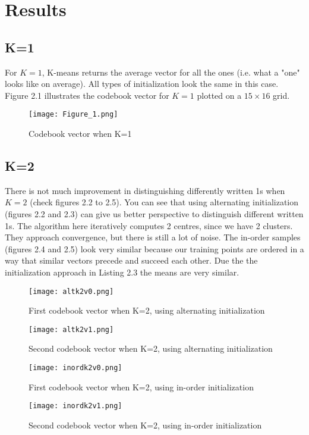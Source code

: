 \documentclass[a4paper, 11pt]{report}
\begin{document}
\section{Results}
\subsection{K=1}
For $K = 1$, K-means returns the average vector for all the ones (i.e. what a "one" looks like on average). All types of initialization look the same in this case. Figure 2.1 illustrates the codebook vector for $K = 1$ plotted on a $15 \times 16$ grid.
\begin{figure}[H]
    \texttt{[image: Figure\_1.png]}
    \caption{Codebook vector when K=1}
\end{figure}

\subsection{K=2}
There is not much improvement in distinguishing differently written 1s when $K=2$ (check figures 2.2 to 2.5). You can see that using alternating initialization (figures 2.2 and 2.3) can give us better perspective to distinguish different written 1s. The algorithm here iteratively computes 2 centres, since we have 2 clusters. They approach convergence, but there is still a lot of noise. The in-order samples (figures 2.4 and 2.5) look very similar because our training points are ordered in a way that similar vectors precede and succeed each other. Due the the initialization approach in Listing 2.3 the means are very similar.
\begin{figure}[H]
    \texttt{[image: altk2v0.png]}
    \caption{First codebook vector when K=2, using alternating initialization}
    \texttt{[image: altk2v1.png]}
    \caption{Second codebook vector when K=2, using alternating initialization}
\end{figure}
\begin{figure}[H]
    \texttt{[image: inordk2v0.png]}
    \caption{First codebook vector when K=2, using in-order initialization}
    \texttt{[image: inordk2v1.png]}
    \caption{Second codebook vector when K=2, using in-order initialization}
\end{figure}
\end{document}
